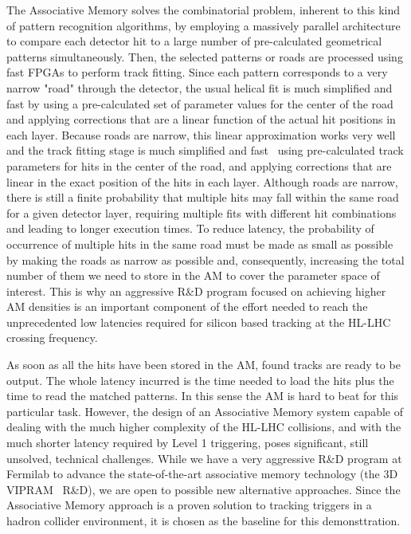 The Associative Memory solves the combinatorial problem, inherent to this kind of pattern recognition algorithms, by employing a massively parallel architecture to compare each detector hit to a large number of pre-calculated geometrical patterns simultaneously. Then, the selected patterns or roads are processed using fast FPGAs to perform track fitting. Since each pattern corresponds to a very narrow "road" through the detector, the usual helical fit is much simplified and fast by using a pre-calculated set of parameter values for the center of the road and applying corrections that are a linear function of the actual hit positions in each layer.  Because roads are narrow, this linear approximation works very well and the track fitting stage is much simplified and fast~\cite{bib:Ann-09} using pre-calculated track parameters for hits in the center of the road, and applying corrections that are linear in the exact position of the hits in each layer. Although roads are narrow, there is still a finite probability that multiple hits may fall within the same road for a given detector layer, requiring multiple fits with different hit combinations and leading to longer execution times. To reduce latency, the probability of occurrence of multiple hits in the same road must be made as small as possible by making the roads as narrow as possible and, consequently, increasing the total number of them we need to store in the AM to cover the parameter space of interest. This is why an aggressive R\&D program focused on achieving higher AM densities is an important component of the effort needed to reach the unprecedented low latencies required for silicon based tracking at the HL-LHC crossing frequency.

As soon as all the hits have been stored in the AM, found tracks are ready to be output. The whole latency incurred is the time needed to load the hits plus the time to read the matched patterns. In this sense the AM is hard to beat for this particular task. However, the design of an Associative Memory system capable of dealing with the much higher complexity of the HL-LHC collisions, and with the much shorter latency required by Level 1 triggering, poses significant, still unsolved, technical challenges. While we have a very aggressive R\&D program at Fermilab to advance the state-of-the-art associative memory technology (the 3D VIPRAM~\cite{bib:VIP-11} R\&D), we are open to possible new alternative approaches. Since the Associative Memory approach is a proven solution to tracking triggers in a hadron collider environment, it is chosen as the baseline for this demonsttration. 



\noindent 







\clearpage